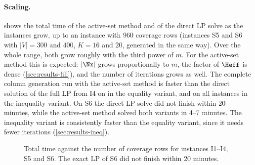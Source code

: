 \paragraph{Scaling.}  shows the total time of the active-set method and of
the direct LP solve as the instances grow, up to an instance with 960 coverage rows
(instances S5 and S6 with $|V| = 300$ and $400$, $K = 16$ and $20$, generated in the same
way). Over the whole range, both grow roughly with the third power of $m$. For the active-set
method this is expected: $|\Nx|$ grows proportionally to $m$, the factor of $\Heff$ is dense
(\cref{sec:results-fill}), and the number of iterations grows as well. The complete column
generation run with the active-set method is faster than the direct solution of the full LP
from I4 on in the equality variant, and on all instances in the inequality variant. On S6 the direct LP solve did not finish within 20 minutes, while the
active-set method solved both variants in 4--7 minutes. The inequality variant is
consistently faster than the equality variant, since it needs fewer iterations
(\cref{sec:results-ineq}).

\begin{figure}[ht]
\centering
{}
\caption{Total time against the number of coverage rows for instances I1--I4, S5 and S6. The
exact LP of S6 did not finish within 20 minutes.}
\label{fig:scaling}
\end{figure}


